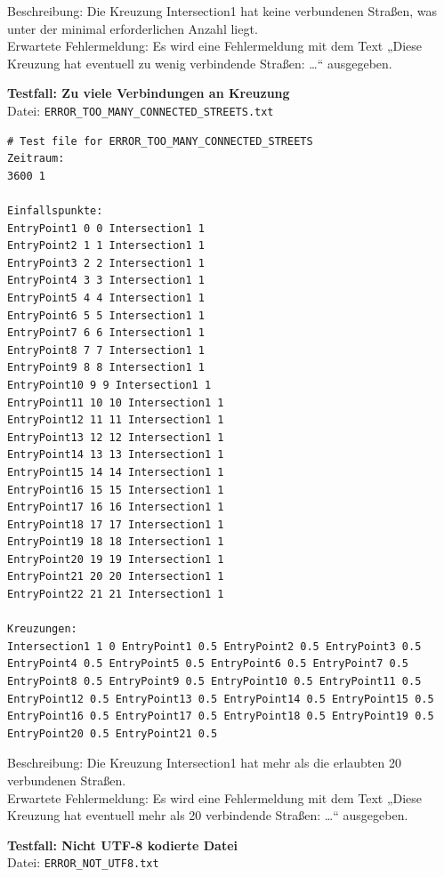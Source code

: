 Beschreibung: Die Kreuzung Intersection1 hat keine verbundenen Straßen, was unter der minimal erforderlichen Anzahl liegt. \\
Erwartete Fehlermeldung: Es wird eine Fehlermeldung mit dem Text „Diese Kreuzung hat eventuell zu wenig verbindende Straßen: …“ ausgegeben.

\clearpage

\textbf{Testfall: Zu viele Verbindungen an Kreuzung} \\
Datei: \texttt{ERROR\_TOO\_MANY\_CONNECTED\_STREETS.txt}

\begin{lstlisting}
# Test file for ERROR_TOO_MANY_CONNECTED_STREETS
Zeitraum:
3600 1

Einfallspunkte:
EntryPoint1 0 0 Intersection1 1
EntryPoint2 1 1 Intersection1 1
EntryPoint3 2 2 Intersection1 1
EntryPoint4 3 3 Intersection1 1
EntryPoint5 4 4 Intersection1 1
EntryPoint6 5 5 Intersection1 1
EntryPoint7 6 6 Intersection1 1
EntryPoint8 7 7 Intersection1 1
EntryPoint9 8 8 Intersection1 1
EntryPoint10 9 9 Intersection1 1
EntryPoint11 10 10 Intersection1 1
EntryPoint12 11 11 Intersection1 1
EntryPoint13 12 12 Intersection1 1
EntryPoint14 13 13 Intersection1 1
EntryPoint15 14 14 Intersection1 1
EntryPoint16 15 15 Intersection1 1
EntryPoint17 16 16 Intersection1 1
EntryPoint18 17 17 Intersection1 1
EntryPoint19 18 18 Intersection1 1
EntryPoint20 19 19 Intersection1 1
EntryPoint21 20 20 Intersection1 1
EntryPoint22 21 21 Intersection1 1

Kreuzungen:
Intersection1 1 0 EntryPoint1 0.5 EntryPoint2 0.5 EntryPoint3 0.5 EntryPoint4 0.5 EntryPoint5 0.5 EntryPoint6 0.5 EntryPoint7 0.5 EntryPoint8 0.5 EntryPoint9 0.5 EntryPoint10 0.5 EntryPoint11 0.5 EntryPoint12 0.5 EntryPoint13 0.5 EntryPoint14 0.5 EntryPoint15 0.5 EntryPoint16 0.5 EntryPoint17 0.5 EntryPoint18 0.5 EntryPoint19 0.5 EntryPoint20 0.5 EntryPoint21 0.5
\end{lstlisting}

Beschreibung: Die Kreuzung Intersection1 hat mehr als die erlaubten 20 verbundenen Straßen. \\
Erwartete Fehlermeldung: Es wird eine Fehlermeldung mit dem Text „Diese Kreuzung hat eventuell mehr als 20 verbindende Straßen: …“ ausgegeben.

\clearpage
\textbf{Testfall: Nicht UTF-8 kodierte Datei} \\
Datei: \texttt{ERROR\_NOT\_UTF8.txt}


